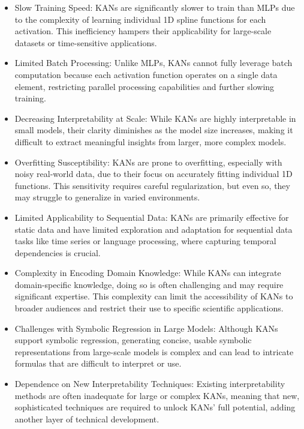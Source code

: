 \begin{itemize}
    \item Slow Training Speed: KANs are significantly slower to train than MLPs due to the complexity of learning individual 1D spline functions for each activation. This inefficiency hampers their applicability for large-scale datasets or time-sensitive applications.
    
    \item Limited Batch Processing: Unlike MLPs, KANs cannot fully leverage batch computation because each activation function operates on a single data element, restricting parallel processing capabilities and further slowing training.
    
    \item Decreasing Interpretability at Scale: While KANs are highly interpretable in small models, their clarity diminishes as the model size increases, making it difficult to extract meaningful insights from larger, more complex models.
    
    \item Overfitting Susceptibility: KANs are prone to overfitting, especially with noisy real-world data, due to their focus on accurately fitting individual 1D functions. This sensitivity requires careful regularization, but even so, they may struggle to generalize in varied environments.
    
    \item Limited Applicability to Sequential Data: KANs are primarily effective for static data and have limited exploration and adaptation for sequential data tasks like time series or language processing, where capturing temporal dependencies is crucial.
    
    \item Complexity in Encoding Domain Knowledge: While KANs can integrate domain-specific knowledge, doing so is often challenging and may require significant expertise. This complexity can limit the accessibility of KANs to broader audiences and restrict their use to specific scientific applications.
    
    \item Challenges with Symbolic Regression in Large Models: Although KANs support symbolic regression, generating concise, usable symbolic representations from large-scale models is complex and can lead to intricate formulas that are difficult to interpret or use.
    
    \item Dependence on New Interpretability Techniques: Existing interpretability methods are often inadequate for large or complex KANs, meaning that new, sophisticated techniques are required to unlock KANs' full potential, adding another layer of technical development.
    

\end{itemize}

